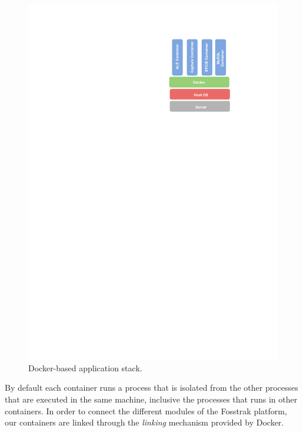 \begin{figure}
  \centering
  \includegraphics[width=.5\textwidth]{images/docker-stack}
  \caption{Docker-based application stack.}
  \label{fig:docker_stack}
\end{figure}

By default each container runs a process that is isolated from the other processes that are executed in the
same machine, inclusive the processes that runs in other containers. In order to connect the different
modules of the Fosstrak platform, our containers are linked through the \textit{linking} mechanism provided
by Docker.
